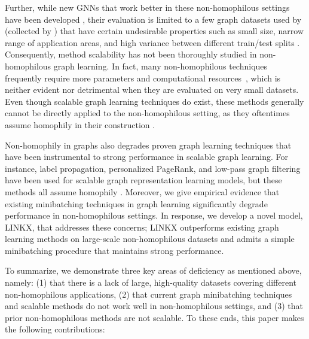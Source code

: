 \documentclass{article}
\begin{document}
Further, while new GNNs that work better in these non-homophilous settings have been developed \cite{zhu2020beyond, nonlocal, zhu2020graph, chien2021adaptive, chen2020simple, yan2021two,  kim2021how, jin2021node, bo2021beyond, nt2020stacked}, their evaluation is limited to a few graph datasets used by \citet{pei2019geom} (collected by \cite{rozemberczki2019multi,tang2009social, mitchell1997web}) that have certain undesirable properties such as small size, narrow range of application areas, and high variance between different train/test splits \cite{zhu2020beyond}.
Consequently, method scalability has not been thoroughly studied in non-homophilous graph learning. In fact, many non-homophilous techniques frequently require more parameters and computational resources~\cite{zhu2020beyond, abu2019mixhop, chien2021adaptive}, which is neither evident nor detrimental when they are evaluated on very small datasets. Even though scalable graph learning techniques do exist, these methods generally cannot be directly applied to the non-homophilous setting, as they oftentimes assume homophily in their construction \cite{wu2019simplifying, huang2021combining, deng2020graphzoom, bojchevski2020scaling}. 

Non-homophily in graphs also degrades proven graph learning techniques that have been instrumental to strong performance in scalable graph learning.
For instance, label propagation, personalized PageRank, and low-pass graph filtering have been used for scalable graph representation learning models, but these methods all assume homophily \cite{wu2019simplifying, huang2021combining, deng2020graphzoom, bojchevski2020scaling}.
Moreover, we give empirical evidence that existing minibatching techniques in graph learning \cite{chiang2019cluster, zeng2019graphsaint} significantly degrade performance in non-homophilous settings.
In response, we develop a novel model, LINKX, that addresses these concerns; LINKX outperforms existing graph learning methods on large-scale non-homophilous datasets and admits a simple minibatching procedure that maintains strong performance.

To summarize, we demonstrate three key areas of deficiency as mentioned above, namely: (1) that there is a lack of large, high-quality datasets covering different non-homophilous applications, (2) that current graph minibatching techniques and scalable methods do not work well in non-homophilous settings, and (3) that prior non-homophilous methods are not scalable. To these ends, this paper makes the following contributions: 
\end{document}
